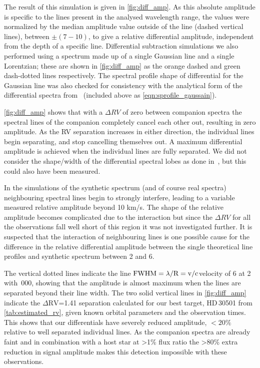 The result of this simulation is given in \cref{fig:diff_amp}.
As this absolute amplitude is specific to the lines present in the analysed wavelength range, the values were normalized by the median amplitude value outside of the line {\fwhm} (dashed vertical lines), between \(\pm(7-10)\)\kmps{}, to give a relative differential amplitude, independent from the depth of a specific line.
Differential subtraction simulations we also performed using a spectrum made up of a single Gaussian line and a single Lorentzian; these are shown in \cref{fig:diff_amp} as the orange dashed and green dash-dotted lines respectively.
The spectral profile shape of differential for the Gaussian line was also checked for consistency with the analytical form of the differential spectra from~\citet[][Equation~A.1]{ferluga_separating_1997} (included above as \cref{eqn:sprofile_gaussain}).

\cref{fig:diff_amp} shows that with a \(\Delta {RV}\) of zero between companion spectra the spectral lines of the companion completely cancel each other out, resulting in zero amplitude.
As the {RV} separation increases in either direction, the individual lines begin separating, and stop cancelling themselves out.
A maximum differential amplitude is achieved when the individual lines are fully separated.
We did not consider the shape/width of the differential spectral lobes as done in~\citet[][eqn.~A.1]{ferluga_separating_1997}, but this could also have been measured.

In the simulations of the synthetic spectrum (and of course real spectra) neighbouring spectral lines begin to strongly interfere, leading to a variable measured relative amplitude beyond 10 km/s.
The shape of the relative amplitude becomes complicated due to the interaction but since the \(\Delta {RV}\) for all the observations fall well short of this region it was not investigated further.
It is suspected that the interaction of neighbouring lines is one possible cause for the difference in the relative differential amplitude between the single theoretical line profiles and synthetic spectrum between 2 and 6\kmps{}.

The vertical dotted lines indicate the line \(\rm {\textrm{FWHM}} = \lambda /\textrm{R}=v /c \)velocity of 6\kmps{} at 2\um{} with \,000, showing that the amplitude is almost maximum when the lines are separated beyond their line width.
The two solid vertical lines in \cref{fig:diff_amp} indicate the \(\Delta \textrm{RV}\)=1.41\kmps{} separation calculated for our best target, {HD\,30501} from \cref{tab:estimated_rv}, given known orbital parameters and the observation times.
This shows that our differentials have severely reduced amplitude, \(<20\%\) relative to well separated individual lines.
As the companion spectra are already faint and in combination with a host star at >1\% flux ratio the >80\% extra reduction in signal amplitude makes this detection impossible with these observations.

